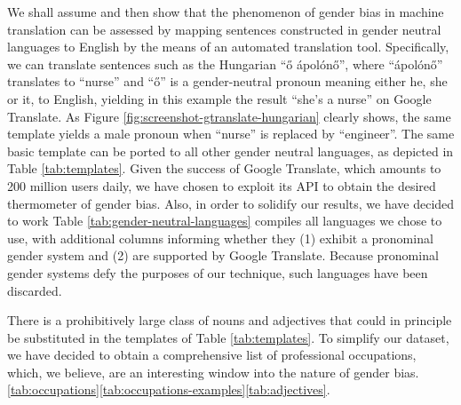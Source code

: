 \documentclass[fleqn,10pt]{article}
\begin{document}
We shall assume and then show that the phenomenon of gender bias in machine translation can be assessed by mapping sentences constructed in gender neutral languages to English by the means of an automated translation tool. Specifically, we can translate sentences such as the Hungarian ``ő ápolónő'', where ``ápolónő'' translates to ``nurse'' and ``ő'' is a gender-neutral pronoun meaning either he, she or it, to English, yielding in this example the result ``she's a nurse'' on Google Translate. As Figure \ref{fig:screenshot-gtranslate-hungarian} clearly shows, the same template yields a male pronoun when ``nurse'' is replaced by ``engineer''. The same basic template can be ported to all other gender neutral languages, as depicted in Table \ref{tab:templates}. Given the success of Google Translate, which amounts to 200 million users daily, we have chosen to exploit its API to obtain the desired thermometer of gender bias. Also, in order to solidify our results, we have decided to work \citep{wals} Table \ref{tab:gender-neutral-languages} compiles all languages we chose to use, with additional columns informing whether they
(1) exhibit a pronominal gender system and (2) are supported by Google Translate. Because pronominal gender systems defy the purposes of our technique, such languages have been discarded.

There is a prohibitively large class of nouns and adjectives that could in principle be substituted in the templates of Table \ref{tab:templates}. To simplify our dataset, we have decided to obtain a comprehensive list of professional occupations, which, we believe, are an interesting window into the nature of gender bias. \citep{BLS2017}\ref{tab:occupations}\ref{tab:occupations-examples}\ref{tab:adjectives}.
\end{document}
